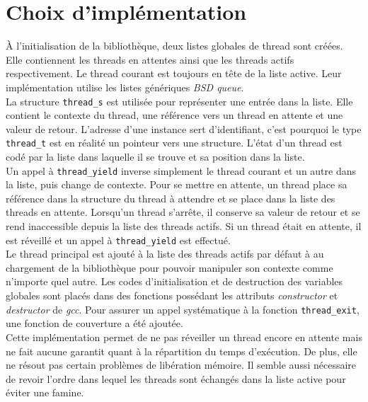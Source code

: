 \section*{Choix d'implémentation}

\`{A} l'initialisation de la bibliothèque, deux listes globales de thread sont créées. Elle contiennent les threads en attentes ainsi que les threads actifs respectivement. Le thread courant est toujours en tête de la liste active. Leur implémentation utilise les listes génériques \textit{BSD queue}.
\\

La structure \texttt{thread\_s} est utilisée pour représenter une entrée dans la liste. Elle contient le contexte du thread, une référence vers un thread en attente et une valeur de retour. L'adresse d'une instance sert d'identifiant, c'est pourquoi le type \texttt{thread\_t} est en réalité un pointeur vers une structure. L'état d'un thread est codé par la liste dans laquelle il se trouve et sa position dans la liste.
\\

Un appel à \texttt{thread\_yield} inverse simplement le thread courant et un autre dans la liste, puis change de contexte. Pour se mettre en attente, un thread place sa référence dans la structure du thread à attendre et se place dans la liste des threads en attente. Lorsqu'un thread s'arrête, il conserve sa valeur de retour et se rend inaccessible depuis la liste des threads actifs. Si un thread était en attente, il est réveillé et un appel à \texttt{thread\_yield} est effectué.
\\

Le thread principal est ajouté à la liste des threads actifs par défaut à au chargement de la bibliothèque pour pouvoir manipuler son contexte comme n'importe quel autre. Les codes d'initialisation et de destruction des variables globales sont placés dans des fonctions possédant les attributs \textit{constructor} et \textit{destructor} de \textit{gcc}. Pour assurer un appel systématique à la fonction \texttt{thread\_exit}, une fonction de couverture a été ajoutée.
\\

Cette implémentation permet de ne pas réveiller un thread encore en attente mais ne fait aucune garantit quant à la répartition du temps d'exécution. De plus, elle ne résout pas certain problèmes de libération mémoire. Il semble aussi nécessaire de revoir l'ordre dans lequel les threads sont échangés dans la liste active pour éviter une famine.

